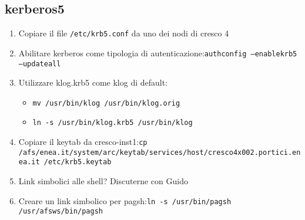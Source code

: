 \documentclass[11pt]{article}
\begin{document}
{\subsection{kerberos5}
\begin{enumerate}
	\item{Copiare il file \texttt{/etc/krb5.conf} da uno dei nodi di cresco 4}
	\item{Abilitare kerberos come tipologia di autenticazione:\newline\texttt{authconfig --enablekrb5 --updateall}}
	\item{Utilizzare klog.krb5 come klog di default:}
		\begin{itemize}
			\item{\texttt{mv /usr/bin/klog /usr/bin/klog.orig}}
			\item{\texttt{ln -s /usr/bin/klog.krb5 /usr/bin/klog}}
		\end{itemize}
	\item{Copiare il keytab da cresco-inst1:\newline\texttt{cp /afs/enea.it/system/arc/keytab/services/host/cresco4x002.portici.enea.it /etc/krb5.keytab}}
	\item{Link simbolici alle shell? Discuterne con Guido}
	\item{Creare un link simbolico per pagsh:\newline\texttt{ln -s /usr/bin/pagsh /usr/afsws/bin/pagsh}}
\end{enumerate}

}
\end{document}
